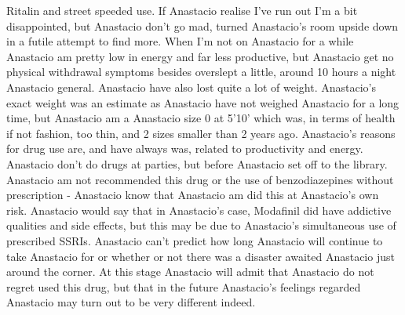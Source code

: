 \documentclass[12pt]{book}
\begin{document}
Ritalin and street speeded use. If Anastacio realise I've run out I'm a bit disappointed, but Anastacio don't go mad, turned Anastacio's room upside down in a futile attempt to find more. When I'm not on Anastacio for a while Anastacio am pretty low in energy and far less productive, but Anastacio get no physical withdrawal symptoms besides overslept a little, around 10 hours a night Anastacio general. Anastacio have also lost quite a lot of weight. Anastacio's exact weight was an estimate as Anastacio have not weighed Anastacio for a long time, but Anastacio am a Anastacio size 0 at 5'10' which was, in terms of health if not fashion, too thin, and 2 sizes smaller than 2 years ago. Anastacio's reasons for drug use are, and have always was, related to productivity and energy. Anastacio don't do drugs at parties, but before Anastacio set off to the library. Anastacio am not recommended this drug or the use of benzodiazepines without prescription - Anastacio know that Anastacio am did this at Anastacio's own risk. Anastacio would say that in Anastacio's case, Modafinil did have addictive qualities and side effects, but this may be due to Anastacio's simultaneous use of prescribed SSRIs. Anastacio can't predict how long Anastacio will continue to take Anastacio for or whether or not there was a disaster awaited Anastacio just around the corner. At this stage Anastacio will admit that Anastacio do not regret used this drug, but that in the future Anastacio's feelings regarded Anastacio may turn out to be very different indeed.
\end{document}
